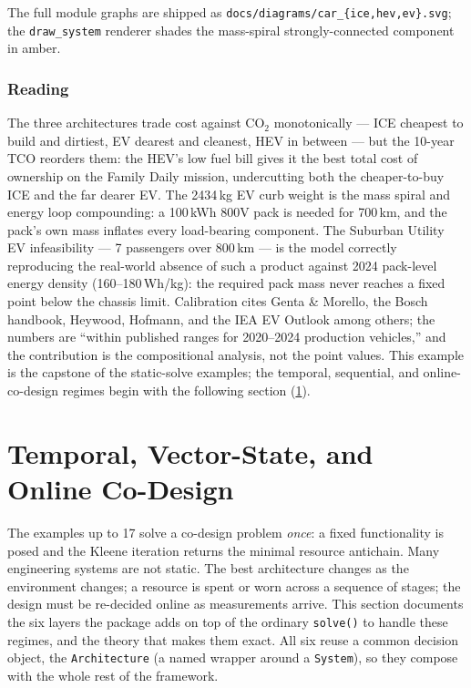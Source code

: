\documentclass[11pt,a4paper]{article}
\begin{document}
The full module graphs are shipped as
\texttt{docs/diagrams/car\_\{ice,hev,ev\}.svg}; the \texttt{draw\_system}
renderer shades the mass-spiral strongly-connected component in amber.

\subsubsection*{Reading}

The three architectures trade cost against CO$_2$ monotonically ---
ICE cheapest to build and dirtiest, EV dearest and cleanest, HEV in
between --- but the 10-year TCO reorders them: the HEV's low fuel bill
gives it the best total cost of ownership on the Family Daily mission,
undercutting both the cheaper-to-buy ICE and the far dearer EV. The
2434\,kg EV curb weight is the mass spiral and energy loop compounding:
a 100\,kWh 800V pack is needed for 700\,km, and the pack's own mass
inflates every load-bearing component. The Suburban Utility EV
infeasibility --- 7 passengers over 800\,km --- is the model correctly
reproducing the real-world absence of such a product against 2024
pack-level energy density (160--180\,Wh/kg): the required pack mass
never reaches a fixed point below the chassis limit. Calibration cites
Genta \& Morello, the Bosch handbook, Heywood, Hofmann, and the IEA EV
Outlook among others; the numbers are ``within published ranges for
2020--2024 production vehicles,'' and the contribution is the
compositional analysis, not the point values. This example is the
capstone of the static-solve examples; the temporal, sequential, and
online-co-design regimes begin with the following section
(\ref{sec:temporal}).

\section{Temporal, Vector-State, and Online Co-Design}
\label{sec:temporal}

The examples up to 17 solve a co-design problem \emph{once}: a fixed
functionality is posed and the Kleene iteration returns the minimal
resource antichain. Many engineering systems are not static. The best
architecture changes as the environment changes; a resource is spent or
worn across a sequence of stages; the design must be re-decided online as
measurements arrive. This section documents the six layers the package
adds on top of the ordinary \texttt{solve()} to handle these regimes, and
the theory that makes them exact. All six reuse a common decision object,
the \texttt{Architecture} (a named wrapper around a \texttt{System}), so
they compose with the whole rest of the framework.
\end{document}
